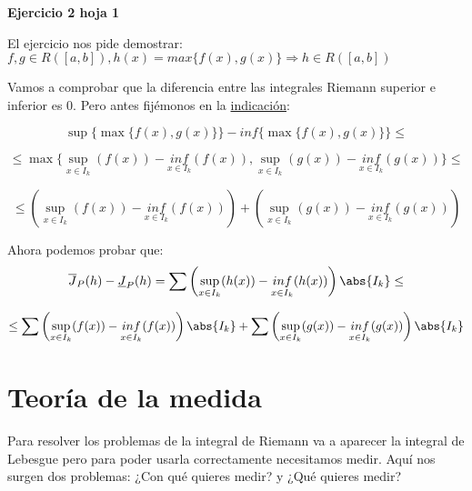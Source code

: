 \documentclass{apuntes}
\begin{document}
\begin{example}
\textbf{Ejercicio 2 hoja 1}

El ejercicio nos pide demostrar: $f,g \in R([a,b]), h(x) = max\lbrace f(x), g(x) \rbrace \Rightarrow h \in R([a,b])$

Vamos a comprobar que la diferencia entre las integrales Riemann superior e inferior es 0.
Pero antes fijémonos en la \underline{indicación}:

\[\sup\big\{ \max\{f(x), g(x)\}\big\} - inf\big\{ \max\{f(x), g(x)\} \big\} \leq \]

\[ \leq \max\big\{ \sup_{x \in I_k} (f(x)) - \underset{x \in I_k}{inf} (f(x)), \sup_{x \in I_k} (g(x)) - \underset{x \in I_k}{inf} (g(x)) \big\} \leq \]

\[ \leq \left(\sup_{x \in I_k} (f(x)) - \underset{x \in I_k}{inf} (f(x))\right) + \left(\sup_{x \in I_k} (g(x)) - \underset{x \in I_k}{inf} (g(x))\right) \]


Ahora podemos probar que:
\[\overline{J}_P(h)-\underline{J}_P(h)
= \sum\left(\sup_{x\in I_k}(h(x))-\underset{x\in I_k}{inf}(h(x))\right)\abs{I_k} \leq\]

\[\leq \sum\left( \sup_{x \in I_k} (f(x)) - \underset{x \in I_k}{inf} (f(x)) \right) \abs{I_k} + 
 \sum\left( \sup_{x \in I_k} (g(x)) - \underset{x \in I_k}{inf} (g(x)) \right) \abs{I_k} \]

 
\end{example}

\chapter{Teoría de la medida}
Para resolver los problemas de la integral de Riemann va a aparecer la integral de Lebesgue pero para poder usarla correctamente necesitamos medir. Aquí nos surgen dos problemas: ¿Con qué quieres medir? y ¿Qué quieres medir?
\end{document}
